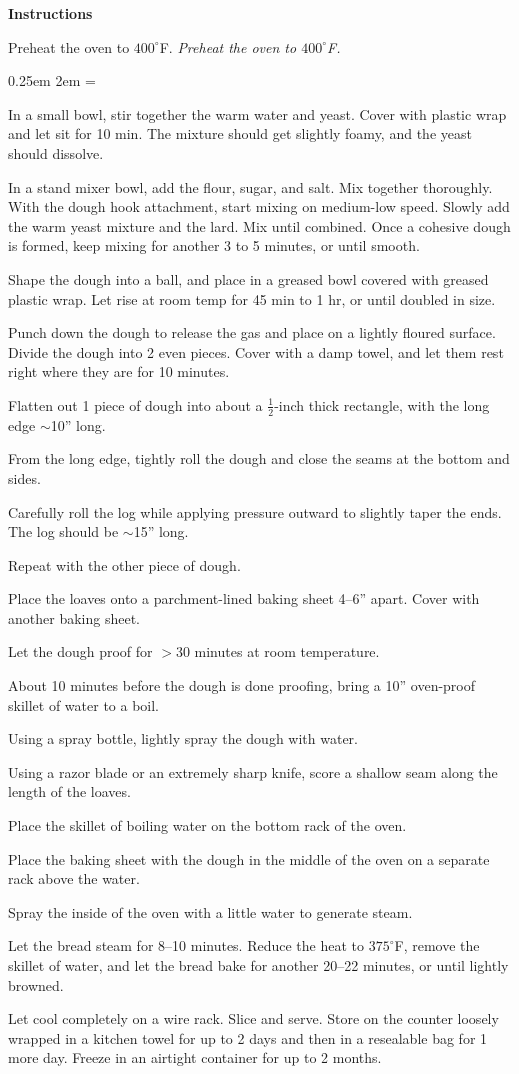 \documentclass{article}
\newcommand{\temp}[1]{$#1^\circ$F}
\newcounter{stepnum}
\newenvironment{method}[1][]{%
    \setcounter{stepnum}{0}
    \noindent
    {\color{red}\Large\textbf{Instructions}}
    \par
    \smallskip
    \if#1
    \else
        \noindent
        \emph{#1}
        \par
    \fi
    \begingroup
    \parindent0pt
    \parskip0.25em
        \leftskip2em
    \everypar={\llap{\ensuremath{\stepcounter{stepnum}\hbox to2em{\thestepnum.\hfill}}}}
}{%
    \par
    \endgroup
}
\begin{document}
\begin{method}[Preheat the oven to \temp{400}.]
    In a small bowl, stir together the warm water and yeast. Cover with plastic wrap and let sit for 10 min. The mixture should get slightly foamy, and the yeast should dissolve.\par
    In a stand mixer bowl, add the flour, sugar, and salt. Mix together thoroughly. With the dough hook attachment, start mixing on medium-low speed. Slowly add the warm yeast mixture and the lard. Mix until combined. Once a cohesive dough is formed, keep mixing for another 3 to 5 minutes, or until smooth.\par
    Shape the dough into a ball, and place in a greased bowl covered with greased plastic wrap. Let rise at room temp for 45 min to 1 hr, or until doubled in size.\par
    Punch down the dough to release the gas and place on a lightly floured surface. Divide the dough into 2 even pieces. Cover with a damp towel, and let them rest right where they are for 10 minutes.\par
    Flatten out 1 piece of dough into about a $\frac{1}{2}$-inch thick rectangle, with the long edge $\sim$10'' long.\par
    From the long edge, tightly roll the dough and close the seams at the bottom and sides.\par
    Carefully roll the log while applying pressure outward to \linebreak slightly taper the ends. The log should be $\sim$15'' long.\par
    Repeat with the other piece of dough.\par
    Place the loaves onto a parchment-lined baking sheet 4--6'' apart. Cover with another baking sheet.\par
    Let the dough proof for $>$30 minutes at room temperature.\par
    About 10 minutes before the dough is done proofing, bring a 10'' oven-proof skillet of water to a boil.\par
    Using a spray bottle, lightly spray the dough with water.\par
    Using a razor blade or an extremely sharp knife, score a shallow seam along the length of the loaves.\par
    Place the skillet of boiling water on the bottom rack of the oven.\par
    Place the baking sheet with the dough in the middle of the oven on a separate rack above the water.\par
    Spray the inside of the oven with a little water to generate steam.\par
    Let the bread steam for 8--10 minutes. Reduce the heat to \temp{375}, remove the skillet of water, and let the bread bake for another 20--22 minutes, or until lightly browned.\par
    Let cool completely on a wire rack. Slice and serve. Store on the counter loosely wrapped in a kitchen towel for up to 2 days and then in a resealable bag for 1 more day. Freeze in an airtight container for up to 2 months.\par
\end{method}
\end{document}
